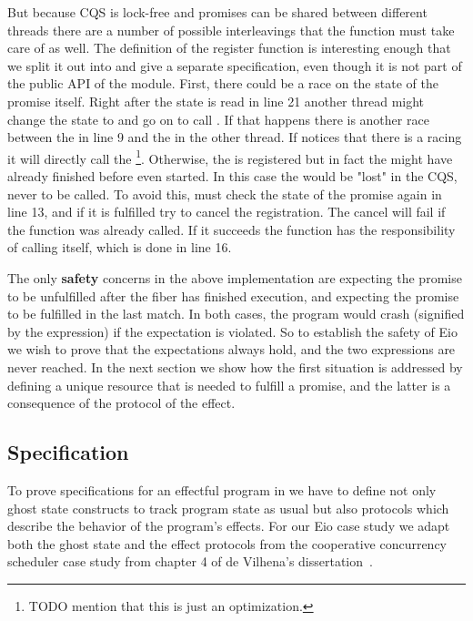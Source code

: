 But because CQS is lock-free and promises can be shared between different threads there are a number of possible interleavings that the  function must take care of as well.
The definition of the register function is interesting enough that we split it out into  and give a separate specification, even though it is not part of the public API of the module.
First, there could be a race on the state of the promise itself.
Right after the state is read in line 21 another thread might change the state to  and go on to call .
If that happens there is another race between the  in line 9 and the  in the other thread.
If  notices that there is a racing  it will directly call the \footnote{TODO mention that this is just an optimization.}.
Otherwise, the  is registered but in fact the  might have already finished before  even started.
In this case the  would be "lost" in the CQS, never to be called.
To avoid this,  must check the state of the promise again in line 13, and if it is fulfilled try to cancel the  registration.
The cancel will fail if the  function was already called.
If it succeeds the  function has the responsibility of calling  itself, which is done in line 16.

The only \textbf{safety} concerns in the above implementation are  expecting the promise to be unfulfilled after the fiber has finished execution, and  expecting the promise to be fulfilled in the last match.
In both cases, the program would crash (signified by the  expression) if the expectation is violated.
So to establish the safety of Eio we wish to prove that the expectations always hold, and the two  expressions are never reached.
In the next section we show how the first situation is addressed by defining a unique resource that is needed to fulfill a promise, and the latter is a consequence of the protocol of the \esuspend{} effect.

\subsection{Specification}
\label{sec:sched-spec}

To prove specifications for an effectful program in \hazel{} we have to define not only ghost state constructs to track program state as usual but also protocols which describe the behavior of the program's effects.
For our Eio case study we adapt both the ghost state and the effect protocols from the cooperative concurrency scheduler case study from chapter 4 of de Vilhena's dissertation~\cite{de2022proof}.

